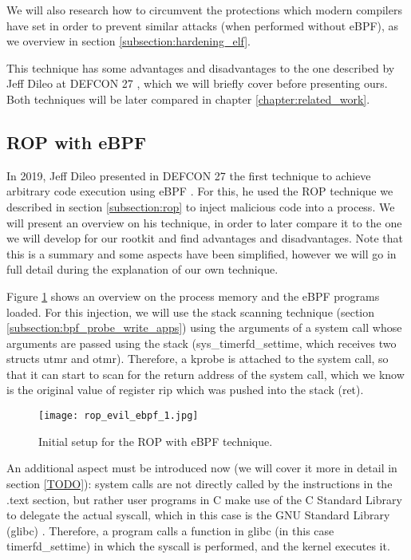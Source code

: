 We will also research how to circumvent the protections which modern compilers have set in order to prevent similar attacks (when performed without eBPF), as we overview in section \ref{subsection:hardening_elf}.

This technique has some advantages and disadvantages to the one described by Jeff Dileo at DEFCON 27 \cite{evil_ebpf_p6974}, which we will briefly cover before presenting ours. Both techniques will be later compared in chapter \ref{chapter:related_work}.


\subsection{ROP with eBPF} \label{subsection:rop_ebpf}
In 2019, Jeff Dileo presented in DEFCON 27 the first technique to achieve arbitrary code execution using eBPF \cite{evil_ebpf_p6974}. For this, he used the ROP technique we described in section \ref{subsection:rop} to inject malicious code into a process. We will present an overview on his technique, in order to later compare it to the one we will develop for our rootkit and find advantages and disadvantages. Note that this is a summary and some aspects have been simplified, however we will go in full detail during the explanation of our own technique.

Figure \ref{fig:rop_evil_ebpf_1} shows an overview on the process memory and the eBPF programs loaded. For this injection, we will use the stack scanning technique (section \ref{subsection:bpf_probe_write_apps}) using the arguments of a system call whose arguments are passed using the stack (sys\_timerfd\_settime, which receives two structs utmr and otmr). Therefore, a kprobe is attached to the system call, so that it can start to scan for the return address of the system call, which we know is the original value of register rip which was pushed into the stack (ret).

\begin{figure}[htbp]
	\centering
	\texttt{[image: rop\_evil\_ebpf\_1.jpg]}
	\caption{Initial setup for the ROP with eBPF technique.}
	\label{fig:rop_evil_ebpf_1}
\end{figure}

An additional aspect must be introduced now (we will cover it more in detail in section \ref{TODO}): system calls are not directly called by the instructions in the .text section, but rather user programs in C make use of the C Standard Library to delegate the actual syscall, which in this case is the GNU Standard Library (glibc) \cite{glibc}. Therefore, a program calls a function in glibc (in this case timerfd\_settime) in which the syscall is performed, and the kernel executes it.

